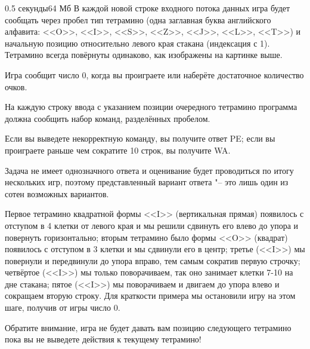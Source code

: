 \begin{problem}{}{}{}{0.5 секунды}{64 Мб}
\InputFile
В каждой новой строке входного потока данных игра будет сообщать через пробел тип
тетрамино (одна заглавная буква английского алфавита: <<O>>, <<I>>, <<S>>, <<Z>>, <<J>>, <<L>>,
<<T>>) и начальную позицию относительно левого края стакана (индексация с 1). Тетрамино всегда
повёрнуты одинаково, как изображены на картинке выше.

Игра сообщит число 0, когда вы проиграете или наберёте достаточное количество очков.

\OutputFile
На каждую строку ввода с указанием позиции очередного тетрамино программа должна сообщить набор
команд, разделённых пробелом.

Если вы выведете некорректную команду, вы получите ответ PE; если вы проиграете раньше чем
сократите 10 строк, вы получите WA.

\Example

\begin{example}
%
\end{example}

\Note
Задача не имеет однозначного ответа и оценивание будет проводиться по итогу нескольких игр, 
поэтому представленный вариант ответа "-- это лишь один из сотен возможных вариантов.

Первое тетрамино квадратной формы <<I>> (вертикальная прямая) появилось с отступом в 4 клетки
от левого края и мы решили сдвинуть его влево до упора и повернуть горизонтально; вторым
тетрамино было формы <<O>> (квадрат) появилось с отступом в 3 клетки и мы сдвинули
его в центр; третье (<<I>>) мы повернули и передвинули до упора вправо, тем самым сократив
первую строчку; четвёртое (<<I>>) мы только поворачиваем, так оно занимает клетки 7-10 на дне
стакана; пятое (<<I>>) мы поворачиваем и двигаем до упора влево и сокращаем вторую строку.
Для краткости примера мы остановили игру на этом шаге, получив от игры число 0.

Обратите внимание, игра не будет давать вам позицию следующего тетрамино пока вы не выведете
действия к текущему тетрамино!

\end{problem}

